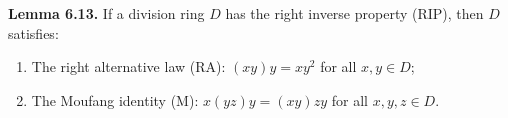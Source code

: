 \textbf{Lemma 6.13.} If a division ring $D$ has the right inverse property (RIP), then $D$ satisfies:
\begin{enumerate}
\item The right alternative law (RA): $(xy)y = xy^2$ for all $x, y \in D$;
\item The Moufang identity (M): $x(yz)y = (xy)zy$ for all $x, y, z \in D$.
\end{enumerate}
